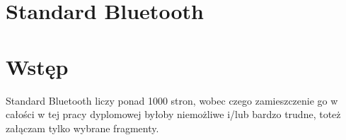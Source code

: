 \newpage %
\section{Standard Bluetooth}
\section{Wstęp}
Standard Bluetooth liczy ponad 1000 stron, wobec czego zamieszczenie go w całości w tej pracy dyplomowej byłoby niemożliwe i/lub bardzo trudne, toteż załączam tylko wybrane fragmenty.
